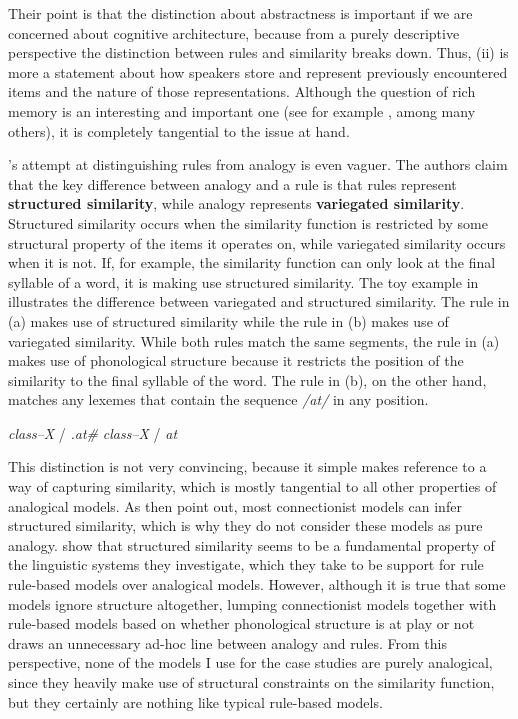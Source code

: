 Their point is that the distinction about abstractness is important if we are concerned about cognitive architecture, because from a purely descriptive perspective the distinction between rules and similarity breaks down. Thus, (ii) is more a statement about how speakers store and represent previously encountered items and the nature of those representations. Although the question of rich memory is an interesting and important one (see for example \cites{Bybee.2010, Kapatsinski.2014a, Port.2010, Port.2010a}, among many others), it is completely tangential to the issue at hand.

\citet{Albright.2003}'s attempt at distinguishing rules from analogy is even vaguer. The authors claim that the key difference between analogy and a rule is that rules represent \textbf{structured similarity}, while analogy represents \textbf{variegated similarity}. Structured similarity occurs when the similarity function is restricted by some structural property of the items it operates on, while variegated similarity occurs when it is not. If, for example, the similarity function can only look at the final syllable of a word, it is making use structured similarity. The toy example in  illustrates the difference between variegated and structured similarity. The rule in (a) makes use of structured similarity while the rule in (b) makes use of variegated similarity. While both rules match the same segments, the rule in (a) makes use of phonological structure because it restricts the position of the similarity to the final syllable of the word. The rule in (b), on the other hand, matches any lexemes that contain the sequence \textit{/at/} in any position.

\begin{exe}
    \ex \label{structured-simil}
    \begin{xlist}
        \ex \textit{class--X} / \textit{.at\#}
        \ex \textit{class--X} / \textit{at}
    \end{xlist}
\end{exe}

This distinction is not very convincing, because it simple makes reference to a way of capturing similarity, which is mostly tangential to all other properties of analogical models. As \textcite[5]{Albright.2003} then point out, most connectionist models can infer structured similarity, which is why they do not consider these models as pure analogy. \textcite{Albright.2003} show that structured similarity seems to be a fundamental property of the linguistic systems they investigate, which they take to be support for rule rule-based models over analogical models. However, although it is true that some models ignore structure altogether, lumping connectionist models together with rule-based models based on whether phonological structure is at play or not draws an unnecessary ad-hoc line  between analogy and rules. From this perspective, none of the models I use for the case studies are purely analogical, since they heavily make use of structural constraints on the similarity function, but they certainly are nothing like typical rule-based models.

